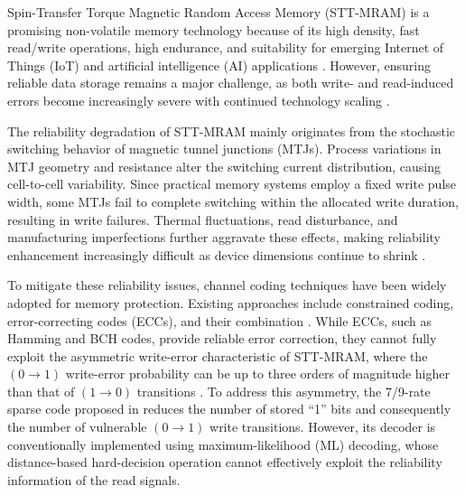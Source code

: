 \documentclass[conference]{IEEEtran}
\begin{document}
Spin-Transfer Torque Magnetic Random Access Memory (STT-MRAM) is a promising non-volatile memory technology because of its high density, fast read/write operations, high endurance, and suitability for emerging Internet of Things (IoT) and artificial intelligence (AI) applications \cite{girard2020survey}. However, ensuring reliable data storage remains a major challenge, as both write- and read-induced errors become increasingly severe with continued technology scaling \cite{hemaram2025asymmetric}.

The reliability degradation of STT-MRAM mainly originates from the stochastic switching behavior of magnetic tunnel junctions (MTJs). Process variations in MTJ geometry and resistance alter the switching current distribution, causing cell-to-cell variability. Since practical memory systems employ a fixed write pulse width, some MTJs fail to complete switching within the allocated write duration, resulting in write failures. Thermal fluctuations, read disturbance, and manufacturing imperfections further aggravate these effects, making reliability enhancement increasingly difficult as device dimensions continue to shrink \cite{wu2020survey}.

To mitigate these reliability issues, channel coding techniques have been widely adopted for memory protection. Existing approaches include constrained coding, error-correcting codes (ECCs), and their combination \cite{nguyen2026error}. While ECCs, such as Hamming and BCH codes, provide reliable error correction, they cannot fully exploit the asymmetric write-error characteristic of STT-MRAM, where the $(0 \rightarrow 1)$ write-error probability can be up to three orders of magnitude higher than that of $(1 \rightarrow 0)$ transitions \cite{hemaram2025asymmetric}. To address this asymmetry, the 7/9-rate sparse code proposed in \cite{nguyen2021design} reduces the number of stored ``1'' bits and consequently the number of vulnerable $(0 \rightarrow 1)$ write transitions. However, its decoder is conventionally implemented using maximum-likelihood (ML) decoding, whose distance-based hard-decision operation cannot effectively exploit the reliability information of the read signals.
\end{document}
